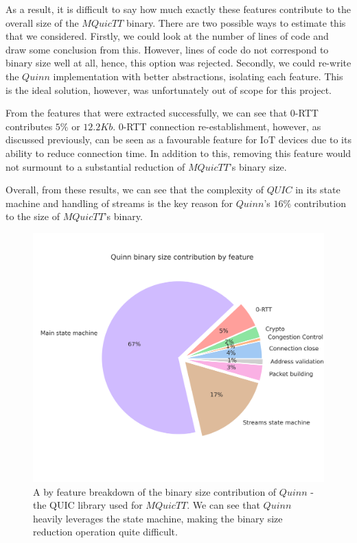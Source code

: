 As a result, it is difficult to say how much exactly these features contribute to the overall size of the $MQuicTT$ binary.
There are two possible ways to estimate this that we considered.
Firstly, we could look at the number of lines of code and draw some conclusion from this.
However, lines of code do not correspond to binary size well at all, hence, this option was rejected.
Secondly, we could re-write the $Quinn$ implementation with better abstractions, isolating each feature.
This is the ideal solution, however, was unfortunately out of scope for this project.

From the features that were extracted successfully, we can see that 0-RTT contributes $5\%$ or $12.2Kb$.
0-RTT connection re-establishment, however, as discussed previously, can be seen as a favourable feature for IoT devices due to its ability to reduce connection time.
In addition to this, removing this feature would not surmount to a substantial reduction of $MQuicTT$'s binary size.

Overall, from these results, we can see that the complexity of $QUIC$ in its state machine and handling of streams is the key reason for $Quinn$'s $16\%$ contribution to the size of $MQuicTT$'s binary.

\begin{figure}[ht]
    \centering
    \includegraphics[width=0.75\linewidth]{images/mquictt_binary_by_function.png}
    \caption{A by feature breakdown of the binary size contribution of $Quinn$ - the QUIC library used for $MQuicTT$. We can see that $Quinn$ heavily leverages the state machine, making the binary size reduction operation quite difficult.}
    \label{fig:mquictt_bin_func}
\end{figure}

